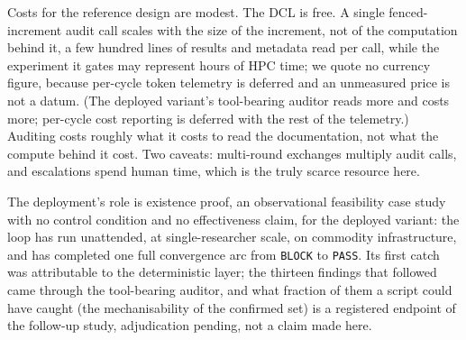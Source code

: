 \documentclass[11pt,letterpaper]{article}
\begin{document}
Costs for the reference design are modest. The DCL is free. A single fenced-increment audit call scales with the size of the increment, not of the computation behind it, a few hundred lines of results and metadata read per call, while the experiment it gates may represent hours of HPC time; we quote no currency figure, because per-cycle token telemetry is deferred and an unmeasured price is not a datum. (The deployed variant's tool-bearing auditor reads more and costs more; per-cycle cost reporting is deferred with the rest of the telemetry.) Auditing costs roughly what it costs to read the documentation, not what the compute behind it cost. Two caveats: multi-round exchanges multiply audit calls, and escalations spend human time, which is the truly scarce resource here.

The deployment's role is existence proof, an observational feasibility case study with no control condition and no effectiveness claim, for the deployed variant: the loop has run unattended, at single-researcher scale, on commodity infrastructure, and has completed one full convergence arc from \texttt{BLOCK} to \texttt{PASS}. Its first catch was attributable to the deterministic layer; the thirteen findings that followed came through the tool-bearing auditor, and what fraction of them a script could have caught (the mechanisability of the confirmed set) is a registered endpoint of the follow-up study, adjudication pending, not a claim made here.
\end{document}
